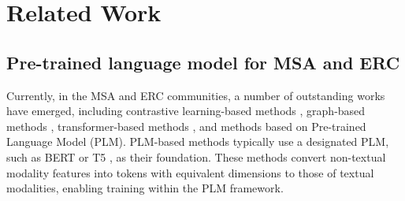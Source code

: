 \section{Related Work}
\subsection{Pre-trained language model for MSA and ERC}
	Currently, in the MSA and ERC communities, a number of outstanding works have emerged, including contrastive learning-based methods \cite{yang2023confede, mai2023learning}, graph-based methods \cite{li2023ga2mif, hu2021mmgcn, lin-etal-2022-modeling}, transformer-based methods \cite{sun2023layer, zhang2023learning, yang2023code}, and methods based on Pre-trained Language Model (PLM). PLM-based methods typically use a designated PLM, such as BERT \cite{devlin2018bert} or T5 \cite{raffel2020exploring}, as their foundation. These methods convert non-textual modality features into tokens with equivalent dimensions to those of textual modalities, enabling training within the PLM framework.
	

